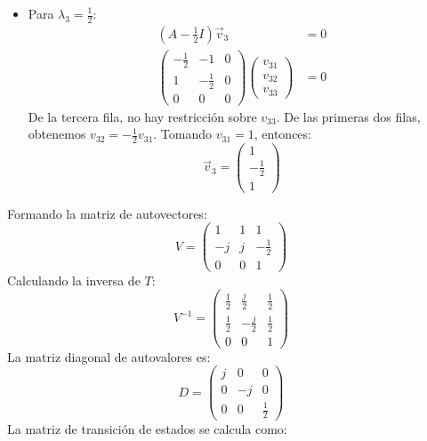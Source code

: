 \documentclass[
  11pt,
  letterpaper,
   addpoints,
   answers
  ]{exam}
\begin{document}
\begin{questions}
\begin{solution}
\begin{itemize}
  \item Para $\lambda_3 = \frac{1}{2}$:
  \begin{align}
    (A - \frac{1}{2}I)\vec{v}_3 &= 0 \\
    \begin{pmatrix} -\frac{1}{2} & -1 & 0 \\ 1 & -\frac{1}{2} &
  0 \\ 0 & 0 & 0 \end{pmatrix} \begin{pmatrix} v_{31} \\ v_{32} \\ v_{33} \end{pmatrix} &= 0
  \end{align}
  De la tercera fila, no hay restricción sobre $v_{33}$. De las primeras dos filas, obtenemos $v_{32} = -\frac{1}{2} v_{31}$. Tomando $v_{31} = 1$, entonces:
  \begin{equation}
    \vec{v}_3 = \begin{pmatrix} 1 \\ -\frac{1}{2} \\ 1 \end{pmatrix}
  \end{equation}
\end{itemize}
Formando la matriz de autovectores:
\begin{equation}
  V = \begin{pmatrix} 1 & 1 & 1 \\ -j & j & -\frac{1}{2} \\ 0 & 0 & 1 \end{pmatrix}
\end{equation}
Calculando la inversa de $T$:
\begin{equation}
  V^{-1} = \begin{pmatrix} \frac{1}{2} & \frac{j}{2} & \frac{1}{2} \\ \frac{1}{2} & -\frac{j}{2} & \frac{1}{2} \\ 0 & 0 & 1 \end{pmatrix}
\end{equation}
La matriz diagonal de autovalores es:
\begin{equation}
  D = \begin{pmatrix} j & 0 & 0 \\ 0 & -j & 0 \\ 0 & 0 & \frac{1}{2} \end{pmatrix}
\end{equation}
La matriz de transición de estados se calcula como:
\begin{align}

\end{align}
\end{solution}
\end{questions}
\end{document}
